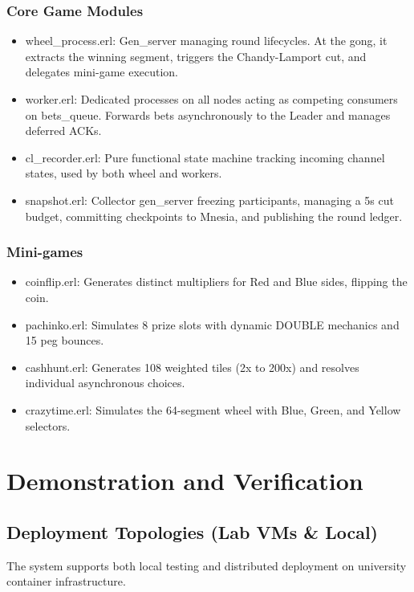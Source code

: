 \documentclass[12pt,a4paper]{article}
\begin{document}
\subsubsection{Core Game Modules}
\begin{itemize}
    \item wheel\_\allowbreak process.erl: Gen\_\allowbreak server managing round lifecycles. At the gong, it extracts the winning segment, triggers the Chandy-Lamport cut, and delegates mini-game execution.
    \item worker.erl: Dedicated processes on all nodes acting as competing consumers on bets\_\allowbreak queue. Forwards bets asynchronously to the Leader and manages deferred ACKs.
    \item cl\_\allowbreak recorder.erl: Pure functional state machine tracking incoming channel states, used by both wheel and workers.
    \item snapshot.erl: Collector gen\_\allowbreak server freezing participants, managing a 5s cut budget, committing checkpoints to Mnesia, and publishing the round ledger.
\end{itemize}

\subsubsection{Mini-games}
\begin{itemize}
    \item coinflip.erl: Generates distinct multipliers for Red and Blue sides, flipping the coin.
    \item pachinko.erl: Simulates 8 prize slots with dynamic DOUBLE mechanics and 15 peg bounces.
    \item cashhunt.erl: Generates 108 weighted tiles (2x to 200x) and resolves individual asynchronous choices.
    \item crazytime.erl: Simulates the 64-segment wheel with Blue, Green, and Yellow selectors.
\end{itemize}

\section{Demonstration and Verification}

\subsection{Deployment Topologies (Lab VMs \& Local)}
The system supports both local testing and distributed deployment on university container infrastructure.
\end{document}
